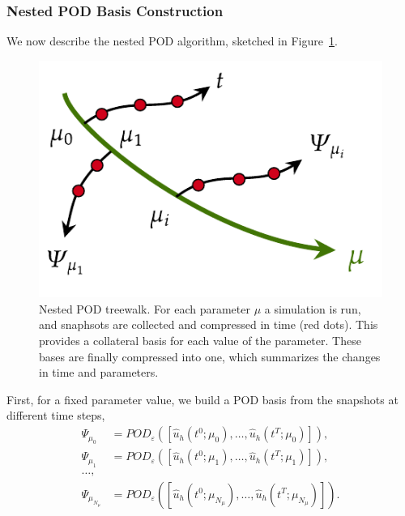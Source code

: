 \documentclass[../../thesis.tex]{subfiles}
\begin{document}

\subsubsection{Nested POD Basis Construction}
\label{sec:1d_rom_burgers_basis_construction_nested}
We now describe the nested POD algorithm, 
sketched in Figure~\ref{fig:treewalk_sketch}.
\begin{figure}[h]
    \centering
    \includegraphics[width=0.8\columnwidth]{research_project/piston/figures/treewalk.pdf}
    \caption{Nested POD treewalk.
    For each parameter $\mu$ a simulation is run,
    and snaphsots are collected and compressed in time (red dots).
    This provides a collateral basis for each value of the parameter.
    These bases are finally compressed into one, 
    which summarizes the changes in time and parameters.}
    \label{fig:treewalk_sketch}
\end{figure}
First, for a fixed parameter value, we build a POD basis from the snapshots at different time steps,
\begin{align*}
    \Psi_{\mu_0} &= POD_{\varepsilon}\left(\left[\hat{u}_h(t^0; \mu_0), \ldots, \hat{u}_h(t^T; \mu_0)\right]\right), \\
    \Psi_{\mu_1} &= POD_{\varepsilon}\left(\left[\hat{u}_h(t^0; \mu_1), \ldots, \hat{u}_h(t^T; \mu_1)\right]\right), \\  
    \ldots, \\
    \Psi_{\mu_{N_{\mu}}} &= POD_{\varepsilon}\left(\left[\hat{u}_h(t^0; \mu_{N_{\mu}}), \ldots, \hat{u}_h(t^T; \mu_{N_{\mu}})\right]\right).
\end{align*}
\end{document}
